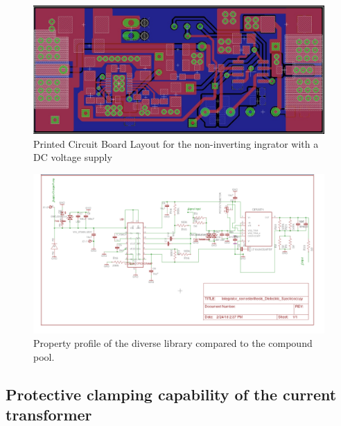 \begin{figure}
\includegraphics[width=0.99\textwidth]{figures/Method/integrator/PCB_Integrator.png}
    \caption{Printed Circuit Board Layout for the non-inverting ingrator with a DC voltage supply} 
\end{figure}
    
    
    
\begin{figure}
\includegraphics[width=0.99\textwidth]{figures/Method/integrator/schematic.jpg}
 \caption{Property profile of the diverse library compared to the compound pool.}
 \end{figure}


\subsection{Protective clamping capability of the current transformer}
\label{clamping}

